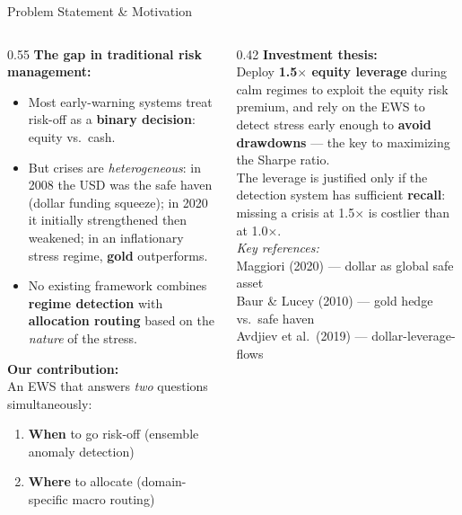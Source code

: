 \documentclass[aspectratio=169, 11pt]{beamer}
\begin{document}
\begin{frame}{Problem Statement \& Motivation}
\begin{columns}[T]
\begin{column}{0.55\textwidth}
  \textbf{The gap in traditional risk management:}
  \begin{itemize}
    \item Most early-warning systems treat risk-off as a \textbf{binary decision}: equity vs.\ cash.
    \item But crises are \textit{heterogeneous}: in 2008 the USD was the safe haven (dollar funding squeeze); in 2020 it initially strengthened then weakened; in an inflationary stress regime, \textbf{gold} outperforms.
    \item No existing framework combines \textbf{regime detection} with \textbf{allocation routing} based on the \textit{nature} of the stress.
  \end{itemize}

  \vspace{0.3cm}
  \textbf{Our contribution:}\\
  An EWS that answers \textit{two} questions simultaneously:
  \begin{enumerate}
    \item \textbf{When} to go risk-off (ensemble anomaly detection)
    \item \textbf{Where} to allocate (domain-specific macro routing)
  \end{enumerate}
\end{column}
\begin{column}{0.42\textwidth}
  \textbf{Investment thesis:}\\[0.2cm]
  Deploy \textbf{1.5$\times$ equity leverage} during calm regimes to exploit the equity risk premium, and rely on the EWS to detect stress early enough to \textbf{avoid drawdowns} --- the key to maximizing the Sharpe ratio.\\[0.3cm]
  The leverage is justified only if the detection system has sufficient \textbf{recall}: missing a crisis at 1.5$\times$ is costlier than at 1.0$\times$.\\[0.3cm]

  \footnotesize
  \textit{Key references:}\\
  Maggiori (2020) --- dollar as global safe asset\\
  Baur \& Lucey (2010) --- gold hedge vs.\ safe haven\\
  Avdjiev et al.\ (2019) --- dollar-leverage-flows
\end{column}
\end{columns}
\end{frame}
\end{document}
